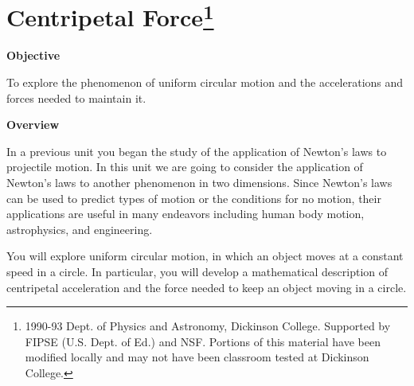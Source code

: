 
\section{Centripetal Force\footnote{
1990-93 Dept. of Physics and Astronomy, Dickinson College. Supported by FIPSE
(U.S. Dept. of Ed.) and NSF. Portions of this material have been modified locally
and may not have been classroom tested at Dickinson College.
}}

\makelabheader %

\bigskip\bigskip
\textbf{Objective} 

To explore the phenomenon of uniform circular motion and the accelerations and
forces needed to maintain it.

\textbf{Overview} 

In a previous unit you began the study of the application of Newton's laws to
projectile motion. In this unit we are going to consider the application of
Newton's laws to another phenomenon in two dimensions. Since Newton's laws can
be used to predict types of motion or the conditions for no motion, their applications
are useful in many endeavors including human body motion, astrophysics, and
engineering.

You will explore uniform circular motion, in which an object moves at a constant
speed in a circle. In particular, you will develop a mathematical description
of centripetal acceleration and the force needed to keep an object moving in
a circle.

